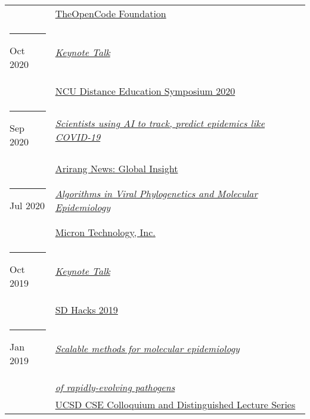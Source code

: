 \documentclass[margin,line]{res}
\begin{document}
\begin{resume}
\begin{longtable}{@{}p{0.7in}p{4in}}
\hspace*{-4mm} & \hspace{4mm} \href{https://www.theopencode.org/}{TheOpenCode Foundation}\\
\hspace*{-4mm} \rule{-1mm}{5mm} Oct 2020 & \href{http://distance.ncu.edu.jm/proposal_submission}{\textit{Keynote Talk}}\\*
\hspace*{-4mm} & \hspace{4mm} \href{http://distance.ncu.edu.jm/proposal_submission}{NCU Distance Education Symposium 2020}\\
\hspace*{-4mm} \rule{-1mm}{5mm} Sep 2020 & \href{https://youtu.be/xHSFWtLL8bc}{\textit{Scientists using AI to track, predict epidemics like COVID-19}}\\*
\hspace*{-4mm} & \hspace{4mm} \href{https://www.arirang.com/}{Arirang News: Global Insight}\\
\hspace*{-4mm} \rule{-1mm}{5mm} Jul 2020 & \href{https://www.micron.com/}{\textit{Algorithms in Viral Phylogenetics and Molecular Epidemiology}}\\*
\hspace*{-4mm} & \hspace{4mm} \href{https://www.micron.com/}{Micron Technology, Inc.}\\
\hspace*{-4mm} \rule{-1mm}{5mm} Oct 2019 & \href{https://www.sdhacks.io/}{\textit{Keynote Talk}}\\*
\hspace*{-4mm} & \hspace{4mm} \href{https://www.sdhacks.io/}{SD Hacks 2019}\\
\hspace*{-4mm} \rule{-1mm}{5mm} Jan 2019 & \href{https://cse.ucsd.edu/about/scalable-methods-molecular-epidemiology-rapidly-evolving-pathogens}{\textit{Scalable methods for molecular epidemiology}}\\*
\hspace*{-4mm} & \hspace{4mm} \href{https://cse.ucsd.edu/about/scalable-methods-molecular-epidemiology-rapidly-evolving-pathogens}{\textit{of rapidly-evolving pathogens}}\\*
\hspace*{-4mm} & \hspace{4mm} \href{https://cse.ucsd.edu/about/cse-colloquium-dls/2018-2019}{UCSD CSE Colloquium and Distinguished Lecture Series}\\

\end{longtable}
\end{resume}
\end{document}
